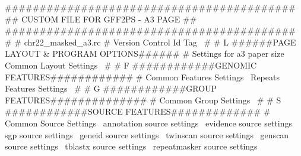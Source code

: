 \documentclass[11pt]{article}
\def\nwendcode{\endtrivlist \endgroup} %
\let\nwdocspar=\par                    %
\begin{document}
\nwenddocs{}\endmoddef
##########################################
##   CUSTOM FILE FOR GFF2PS - A3 PAGE   ##
##########################################
#
# chr22_masked_a3.rc
#
\LA{}Version Control Id Tag~{\nwtagstyle{}}\RA{}
#
# L ######PAGE LAYOUT & PROGRAM OPTIONS######
#
\LA{}Settings for a3 paper size~{\nwtagstyle{}}\RA{}
\LA{}Common Layout Settings~{\nwtagstyle{}}\RA{}
#
# F ############GENOMIC FEATURES############
#
\LA{}Common Features Settings~{\nwtagstyle{}}\RA{}
\LA{}Repeats Features Settings~{\nwtagstyle{}}\RA{}
#
# G ############GROUP FEATURES##############
#
\LA{}Common Group Settings~{\nwtagstyle{}}\RA{}
#
# S ############SOURCE FEATURES#############
#
\LA{}Common Source Settings~{\nwtagstyle{}}\RA{}
\LA{}annotation source settings~{\nwtagstyle{}}\RA{}
\LA{}evidence source settings~{\nwtagstyle{}}\RA{}
\LA{}sgp source settings~{\nwtagstyle{}}\RA{}
\LA{}geneid source settings~{\nwtagstyle{}}\RA{}
\LA{}twinscan source settings~{\nwtagstyle{}}\RA{}
\LA{}genscan source settings~{\nwtagstyle{}}\RA{}
\LA{}tblastx source settings~{\nwtagstyle{}}\RA{}
\LA{}repeatmasker source settings~{\nwtagstyle{}}\RA{}
\nwendcode{}\nwdocspar
\end{document}

